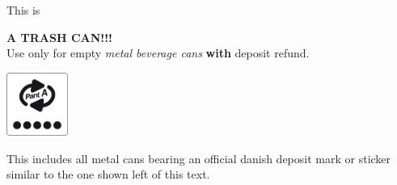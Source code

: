 \documentclass{article}
\begin{document}
\fontsize{40}{50}\selectfont

\parindent 0pt
\parskip 20pt

\maketitle
\null
\vspace{-1cm}

\begin{center}

  {\Huge This is}\\
  \vspace{1cm}

  {\fontsize{70}{80}\selectfont \bfseries{\color{red}{NOT}} A TRASH CAN!!!}\\

  \vspace{2cm}
  {\Huge Use only for empty \textit{metal beverage cans} \textbf{with} deposit
    refund.}

  \vspace{0.8cm}

  \begin{minipage}{0.1\textwidth}
  \includegraphics[width=2cm]{billeder/refund-mark.png}
\end{minipage}
  \begin{minipage}{0.8\textwidth}
    {\Large This includes all metal cans bearing an official danish deposit
    mark or sticker similar to the one shown left of this text.}
\end{minipage}

\end{center}

\underskriv
\end{document}
